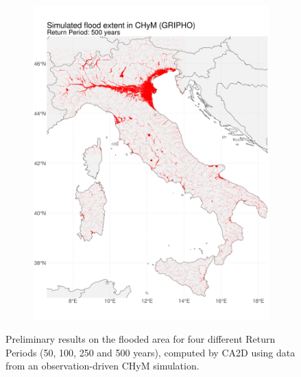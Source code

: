 \begin{figure}
\begin{subfigure}{.49\textwidth}
        \includegraphics[width=\textwidth]{figures/valid_flood/flooded_areas/T500}
    \end{subfigure}
    \decoRule
    \caption[Flooded areas for RP = 50, 100, 250 and 500 years]{Preliminary results on the flooded area for four different Return Periods (50, 100, 250 and 500 years), computed by CA2D using data from an observation-driven CHyM simulation.} \label{fig:flooded_areas}
\end{figure}
